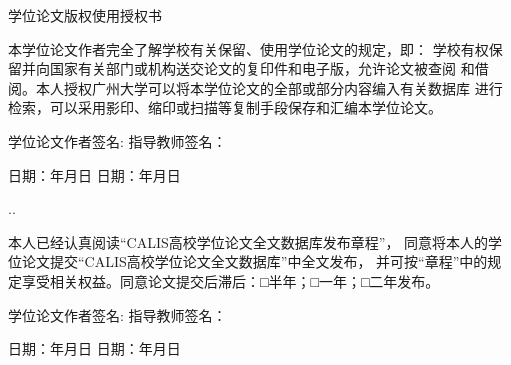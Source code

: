 \begin{center}
    \parbox[t][2cm][c]{\textwidth}{ {\Large \bf \centerline
    {学位论文版权使用授权书} } }
    \parbox[t][3cm][c]{\textwidth}{ {\fontsize{12pt}{18pt}\selectfont
    \hspace{2em}本学位论文作者完全了解学校有关保留、使用学位论文的规定，即：
    学校有权保留并向国家有关部门或机构送交论文的复印件和电子版，允许论文被查阅
    和借阅。本人授权广州大学可以将本学位论文的全部或部分内容编入有关数据库
    进行检索，可以采用影印、缩印或扫描等复制手段保存和汇编本学位论文。}}
   \parbox[t][1.7cm][c]{\textwidth}{\fontsize{12pt}{15pt}\selectfont
   \hspace{2em}%
   学位论文作者签名:
   \hspace*{3.5cm}
   指导教师签名：}
   \parbox[t][1.8cm][c]{\textwidth}{\fontsize{12pt}{15pt}\selectfont
   \hspace{2em} 日期：\hspace{2em}年\hspace{2em}月\hspace{2em}日 %
    \hspace*{2.3cm}日期：\hspace{2em}年\hspace{2em}月\hspace{2em}日
  \vspace{1.5cm}
}
 .\dotfill.
    \parbox[t][2cm][c]{\textwidth}{ {\fontsize{12pt}{18pt}\selectfont
    \hspace{2em}本人已经认真阅读“CALIS高校学位论文全文数据库发布章程”，
    同意将本人的学位论文提交“CALIS高校学位论文全文数据库”中全文发布，
    并可按“章程”中的规定享受相关权益。同意论文提交后滞后：□半年；□一年；□二年发布。}}
   \parbox[t][1.5cm][c]{\textwidth}{\fontsize{12pt}{15pt}\selectfont
   \hspace{2em}%
   学位论文作者签名:
   \hspace*{3.5cm}
   指导教师签名：}
   \parbox[t][0.4cm][c]{\textwidth}{\fontsize{12pt}{15pt}\selectfont
   \hspace{2em} 日期：\hspace{2em}年\hspace{2em}月\hspace{2em}日%
    \hspace*{2.3cm}日期：\hspace{2em}年\hspace{2em}月\hspace{2em}日
    }
    \end{center}
